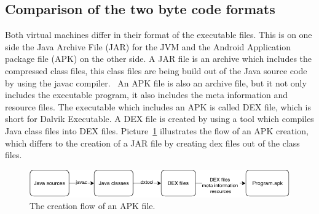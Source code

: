 \subsection{Comparison of the two byte code formats}
\label{sec:comparison-of-the-two-bytecode-formats}
Both virtual machines differ in their format of the executable files.
This is on one side the Java Archive File (JAR) for the JVM and the Android Application package file (APK) on the other side.
A JAR file is an archive which includes the compressed class files, this class files are being build out of the Java source code by using the javac compiler.~\cite{pugh1999compressing} 
An APK file is also an archive file, but it not only includes the executable program, it also includes the meta information and resource files.
The executable which includes an APK is called DEX file, which is short for Dalvik Executable.
A DEX file is created by using a tool which compiles Java class files into DEX files.
Picture~\ref{fig:create-apk} illustrates the flow of an APK creation, which differs to the creation of a JAR file by creating dex files out of the class files.\\
\begin{figure}[h]
\begin{center}
\includegraphics[scale=0.55]{images/create-apk.png} 
\caption{The creation flow of an APK file.}
\label{fig:create-apk}
\end{center}
\end{figure}

